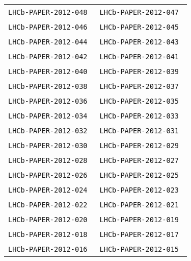 \begin{center}
\begin{longtable}{ll}
\texttt{LHCb-PAPER-2012-048}~\cite{LHCb-PAPER-2012-048} & 
\texttt{LHCb-PAPER-2012-047}~\cite{LHCb-PAPER-2012-047} \\
\texttt{LHCb-PAPER-2012-046}~\cite{LHCb-PAPER-2012-046} & 
\texttt{LHCb-PAPER-2012-045}~\cite{LHCb-PAPER-2012-045} \\
\texttt{LHCb-PAPER-2012-044}~\cite{LHCb-PAPER-2012-044} & 
\texttt{LHCb-PAPER-2012-043}~\cite{LHCb-PAPER-2012-043} \\
\texttt{LHCb-PAPER-2012-042}~\cite{LHCb-PAPER-2012-042} & 
\texttt{LHCb-PAPER-2012-041}~\cite{LHCb-PAPER-2012-041} \\
\texttt{LHCb-PAPER-2012-040}~\cite{LHCb-PAPER-2012-040} & 
\texttt{LHCb-PAPER-2012-039}~\cite{LHCb-PAPER-2012-039} \\
\texttt{LHCb-PAPER-2012-038}~\cite{LHCb-PAPER-2012-038} & 
\texttt{LHCb-PAPER-2012-037}~\cite{LHCb-PAPER-2012-037} \\
\texttt{LHCb-PAPER-2012-036}~\cite{LHCb-PAPER-2012-036} & 
\texttt{LHCb-PAPER-2012-035}~\cite{LHCb-PAPER-2012-035} \\
\texttt{LHCb-PAPER-2012-034}~\cite{LHCb-PAPER-2012-034} & 
\texttt{LHCb-PAPER-2012-033}~\cite{LHCb-PAPER-2012-033} \\
\texttt{LHCb-PAPER-2012-032}~\cite{LHCb-PAPER-2012-032} & 
\texttt{LHCb-PAPER-2012-031}~\cite{LHCb-PAPER-2012-031} \\
\texttt{LHCb-PAPER-2012-030}~\cite{LHCb-PAPER-2012-030} & 
\texttt{LHCb-PAPER-2012-029}~\cite{LHCb-PAPER-2012-029} \\
\texttt{LHCb-PAPER-2012-028}~\cite{LHCb-PAPER-2012-028} & 
\texttt{LHCb-PAPER-2012-027}~\cite{LHCb-PAPER-2012-027} \\
\texttt{LHCb-PAPER-2012-026}~\cite{LHCb-PAPER-2012-026} & 
\texttt{LHCb-PAPER-2012-025}~\cite{LHCb-PAPER-2012-025} \\
\texttt{LHCb-PAPER-2012-024}~\cite{LHCb-PAPER-2012-024} & 
\texttt{LHCb-PAPER-2012-023}~\cite{LHCb-PAPER-2012-023} \\
\texttt{LHCb-PAPER-2012-022}~\cite{LHCb-PAPER-2012-022} & 
\texttt{LHCb-PAPER-2012-021}~\cite{LHCb-PAPER-2012-021} \\
\texttt{LHCb-PAPER-2012-020}~\cite{LHCb-PAPER-2012-020} & 
\texttt{LHCb-PAPER-2012-019}~\cite{LHCb-PAPER-2012-019} \\
\texttt{LHCb-PAPER-2012-018}~\cite{LHCb-PAPER-2012-018} & 
\texttt{LHCb-PAPER-2012-017}~\cite{LHCb-PAPER-2012-017} \\
\texttt{LHCb-PAPER-2012-016}~\cite{LHCb-PAPER-2012-016} & 
\texttt{LHCb-PAPER-2012-015}~\cite{LHCb-PAPER-2012-015} \\

\end{longtable}
\end{center}
